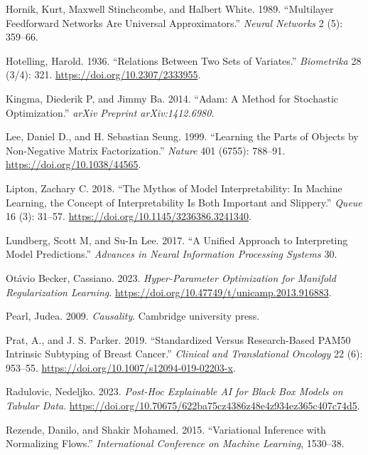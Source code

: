 \documentclass[
  letterpaper,
]{report}
\newlength{\cslhangindent}
\newenvironment{CSLReferences}[2] %
 {\begin{list}{}{%
  \setlength{\itemindent}{0pt}
  \setlength{\leftmargin}{0pt}
  \setlength{\parsep}{0pt}
  \ifodd #1
   \setlength{\leftmargin}{\cslhangindent}
   \setlength{\itemindent}{-1\cslhangindent}
  \fi
  \setlength{\itemsep}{#2\baselineskip}}}
 {\end{list}}
\begin{document}
\begin{CSLReferences}{1}{1}
Hornik, Kurt, Maxwell Stinchcombe, and Halbert White. 1989.
{``Multilayer Feedforward Networks Are Universal Approximators.''}
\emph{Neural Networks} 2 (5): 359--66.

Hotelling, Harold. 1936. {``Relations Between Two Sets of Variates.''}
\emph{Biometrika} 28 (3/4): 321. \url{https://doi.org/10.2307/2333955}.

Kingma, Diederik P, and Jimmy Ba. 2014. {``Adam: A Method for Stochastic
Optimization.''} \emph{arXiv Preprint arXiv:1412.6980}.

Lee, Daniel D., and H. Sebastian Seung. 1999. {``Learning the Parts of
Objects by Non-Negative Matrix Factorization.''} \emph{Nature} 401
(6755): 788--91. \url{https://doi.org/10.1038/44565}.

Lipton, Zachary C. 2018. {``The Mythos of Model Interpretability: In
Machine Learning, the Concept of Interpretability Is Both Important and
Slippery.''} \emph{Queue} 16 (3): 31--57.
\url{https://doi.org/10.1145/3236386.3241340}.

Lundberg, Scott M, and Su-In Lee. 2017. {``A Unified Approach to
Interpreting Model Predictions.''} \emph{Advances in Neural Information
Processing Systems} 30.

Otávio Becker, Cassiano. 2023. \emph{Hyper-Parameter Optimization for
Manifold Regularization Learning}.
\url{https://doi.org/10.47749/t/unicamp.2013.916883}.

Pearl, Judea. 2009. \emph{Causality}. Cambridge university press.

Prat, A., and J. S. Parker. 2019. {``Standardized Versus Research-Based
PAM50 Intrinsic Subtyping of Breast Cancer.''} \emph{Clinical and
Translational Oncology} 22 (6): 953--55.
\url{https://doi.org/10.1007/s12094-019-02203-x}.

Radulovic, Nedeljko. 2023. \emph{Post-Hoc Explainable AI for Black Box
Models on Tabular Data}.
\url{https://doi.org/10.70675/622ba75cz4386z48e4z934ez365c407c74d5}.

Rezende, Danilo, and Shakir Mohamed. 2015. {``Variational Inference with
Normalizing Flows.''} \emph{International Conference on Machine
Learning}, 1530--38.


\end{CSLReferences}
\end{document}
